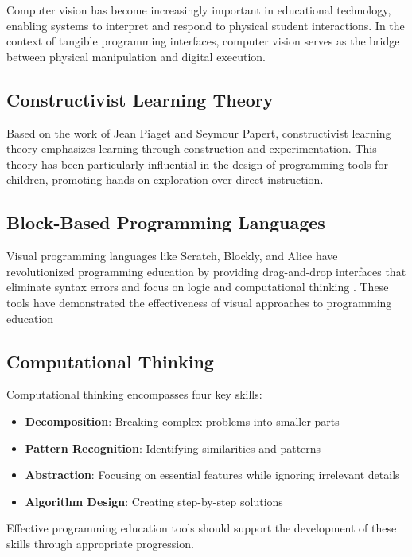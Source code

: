 Computer vision has become increasingly important in educational technology, enabling systems to interpret and respond to physical student interactions. In the context of tangible programming interfaces, computer vision serves as the bridge between physical manipulation and digital execution.


\subsection{Constructivist Learning Theory}

Based on the work of Jean Piaget and Seymour Papert, constructivist learning theory emphasizes learning through construction and experimentation. This theory has been particularly influential in the design of programming tools for children, promoting hands-on exploration over direct instruction.

\subsection{Block-Based Programming Languages}
Visual programming languages like Scratch, Blockly, and Alice have revolutionized programming education by providing drag-and-drop interfaces that eliminate syntax errors and focus on logic and computational thinking \cite{resnick2009scratch}. These tools have demonstrated the effectiveness of visual approaches to programming education \cite{maloney2010scratch}

\subsection{Computational Thinking}

Computational thinking encompasses four key skills:
\begin{itemize}
    \item \textbf{Decomposition}: Breaking complex problems into smaller parts
    \item \textbf{Pattern Recognition}: Identifying similarities and patterns
    \item \textbf{Abstraction}: Focusing on essential features while ignoring irrelevant details
    \item \textbf{Algorithm Design}: Creating step-by-step solutions
\end{itemize}

Effective programming education tools should support the development of these skills through appropriate progression.

